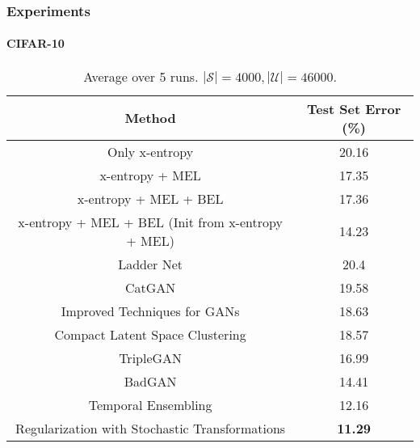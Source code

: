 \begin{frame}
	\frametitle{Experiments}
	\framesubtitle{CIFAR-10}
	\begin{table}
		\centering
		\resizebox{\textwidth}{!}
		{
		\begin{tabular}{|c|c|}
			\hline
			\textbf{Method} & Test Set Error (\%)\\
			\hline
			Only x-entropy & 20.16\\
			x-entropy + MEL & 17.35\\
			x-entropy + MEL + BEL & 17.36\\
			x-entropy + MEL + BEL (Init from x-entropy + MEL) & 14.23\\
			\hline
			\hline
			Ladder Net & 20.4\\
			CatGAN & 19.58\\
			Improved Techniques for GANs & 18.63\\
			Compact Latent Space Clustering & 18.57\\
			TripleGAN & 16.99\\
			BadGAN & 14.41\\
			Temporal Ensembling & 12.16\\
			Regularization with Stochastic Transformations & \textbf{11.29}\\
			\hline
		\end{tabular}
		}
		\caption{\tiny{Average over 5 runs. $|\mathcal{S}| = 4000, |\mathcal{U}| = 46000$.}}
	\end{table}
\end{frame}

